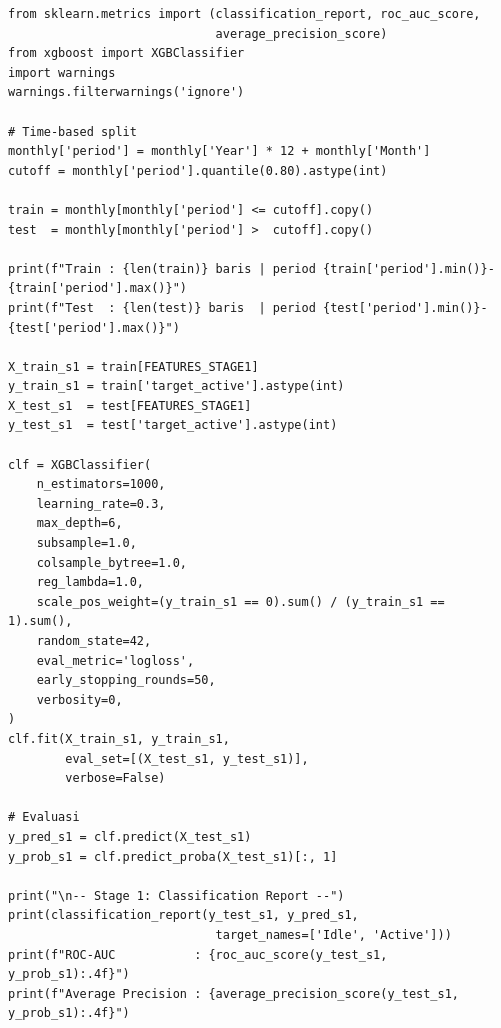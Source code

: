 \begin{lstlisting}[style=pycode,caption={Time-based split dan pelatihan XGBoost Classifier}]
from sklearn.metrics import (classification_report, roc_auc_score,
                             average_precision_score)
from xgboost import XGBClassifier
import warnings
warnings.filterwarnings('ignore')

# Time-based split
monthly['period'] = monthly['Year'] * 12 + monthly['Month']
cutoff = monthly['period'].quantile(0.80).astype(int)

train = monthly[monthly['period'] <= cutoff].copy()
test  = monthly[monthly['period'] >  cutoff].copy()

print(f"Train : {len(train)} baris | period {train['period'].min()}-{train['period'].max()}")
print(f"Test  : {len(test)} baris  | period {test['period'].min()}-{test['period'].max()}")

X_train_s1 = train[FEATURES_STAGE1]
y_train_s1 = train['target_active'].astype(int)
X_test_s1  = test[FEATURES_STAGE1]
y_test_s1  = test['target_active'].astype(int)

clf = XGBClassifier(
    n_estimators=1000,
    learning_rate=0.3,
    max_depth=6,
    subsample=1.0,
    colsample_bytree=1.0,
    reg_lambda=1.0,
    scale_pos_weight=(y_train_s1 == 0).sum() / (y_train_s1 == 1).sum(),
    random_state=42,
    eval_metric='logloss',
    early_stopping_rounds=50,
    verbosity=0,
)
clf.fit(X_train_s1, y_train_s1,
        eval_set=[(X_test_s1, y_test_s1)],
        verbose=False)

# Evaluasi
y_pred_s1 = clf.predict(X_test_s1)
y_prob_s1 = clf.predict_proba(X_test_s1)[:, 1]

print("\n-- Stage 1: Classification Report --")
print(classification_report(y_test_s1, y_pred_s1,
                             target_names=['Idle', 'Active']))
print(f"ROC-AUC           : {roc_auc_score(y_test_s1, y_prob_s1):.4f}")
print(f"Average Precision : {average_precision_score(y_test_s1, y_prob_s1):.4f}")
\end{lstlisting}

